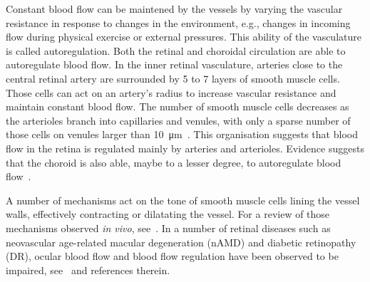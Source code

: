 \documentclass[12pt,a4paper]{journal}
\begin{document}
Constant blood flow can be maintened by the vessels by varying the vascular resistance in response to changes in the environment, e.g., changes in incoming flow during physical exercise or external pressures.
This ability of the vasculature is called autoregulation.
Both the retinal and choroidal circulation are able to autoregulate blood flow.
In the inner retinal vasculature, arteries close to the central retinal artery are surrounded by 5 to 7 layers of smooth muscle cells.
Those cells can act on an artery's radius to increase vascular resistance and maintain constant blood flow.
The number of smooth muscle cells decreases as the arterioles branch into capillaries and venules, with only a sparse number of those cells on venules larger than \SI{10}{\micro\meter}~\cite{An_2020, Kur_2012}.
This organisation suggests that blood flow in the retina is regulated mainly by arteries and arterioles.
Evidence suggests that the choroid is also able, maybe to a lesser degree, to autoregulate blood flow~\cite{CERiva_1997, Polska_2007}.

A number of mechanisms act on the tone of smooth muscle cells lining the vessel walls, effectively contracting or dilatating the vessel.
For a review of those mechanisms observed \textit{in vivo}, see~\cite{Kur_2012}.
In a number of retinal diseases such as neovascular age-related macular degeneration (nAMD) and diabetic retinopathy (DR), ocular blood flow and blood flow regulation have been observed to be impaired, see~\cite{Kur_2012} and references therein.
\end{document}
